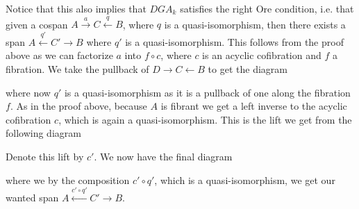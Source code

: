 Notice that this also implies that $DGA_k$ satisfies the right Ore condition, i.e. that given a cospan $A\overset{a}\rightarrow C \overset{q}\leftarrow B$, where $q$ is a quasi-isomorphism, then there exists a span $A\overset{q'}\leftarrow C' \rightarrow B$ where $q'$ is a quasi-isomorphism. This follows from the proof above as we can factorize $a$ into $f\circ c$, where $c$ is an acyclic cofibration and $f$ a fibration. We take the pullback of $D\rightarrow C\leftarrow B$ to get the diagram
\begin{center}
\end{center}
where now $q'$ is a quasi-isomorphism as it is a pullback of one along the fibration $f$. As in the proof above, because $A$ is fibrant we get a left inverse to the acyclic cofibration $c$, which is again a quasi-isomorphism. This is the lift we get from the following diagram
\begin{center}
\end{center}
Denote this lift by $c'$. We now have the final diagram
\begin{center}
\end{center}
where we by the composition $c'\circ q'$, which is a quasi-isomorphism, we get our wanted span $A\overset{c'\circ q'}\leftarrow C'\rightarrow B$. 

